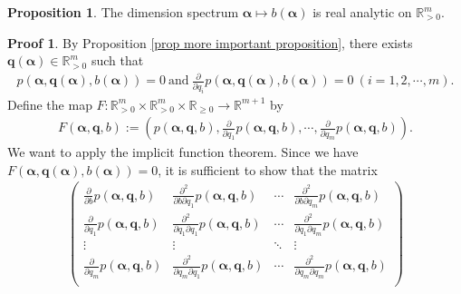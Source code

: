 \documentclass{article}
\theoremstyle{definition}
\newtheorem{prop}[thm]{Proposition}
\newtheorem*{pf}{Proof}
\begin{document}
\begin{prop}\label{prop regularity of the dimension spectrum}
The dimension spectrum $\boldsymbol{\alpha} \mapsto b(\boldsymbol{\alpha})$ is real analytic on $\mathbb{R}_{>0}^m$.
\end{prop}






\begin{pf}
By Proposition \ref{prop more important proposition}, there exists $\boldsymbol{q}(\boldsymbol{\alpha})\in\mathbb{R}_{>0}^m$ such that 
\begin{align}\nonumber
    p(\boldsymbol{\alpha},\boldsymbol{q}(\boldsymbol{\alpha}),b(\boldsymbol{\alpha}))=0\ \text{and}\ \frac{\partial}{\partial q_i}p(\boldsymbol{\alpha},\boldsymbol{q}(\boldsymbol{\alpha}),b(\boldsymbol{\alpha}))=0\ (i=1,2,\cdots,m).\nonumber
\end{align}
Define the map 
$F:\mathbb{R}^m_{>0}\times\mathbb{R}^m_{>0}\times\mathbb{R}_{\geq 0}\rightarrow\mathbb{R}^{m+1}$ by
\begin{align}
F(\boldsymbol{\alpha},\boldsymbol{q},b):=\left(p(\boldsymbol{\alpha},\boldsymbol{q},b), \frac{\partial}{\partial q_1}p(\boldsymbol{\alpha},\boldsymbol{q},b),\cdots, \frac{\partial}{\partial q_m}p(\boldsymbol{\alpha},\boldsymbol{q},b)\right)\nonumber.
\end{align}
We want to apply the implicit function theorem. Since we have $F(\boldsymbol{\alpha},\boldsymbol{q}(\boldsymbol{\alpha}),b(\boldsymbol{\alpha}))=0$, it is sufficient to show that the matrix 
\begin{align}\nonumber
\begin{pmatrix}
\frac{\partial}{\partial b}p(\boldsymbol{\alpha},\boldsymbol{q},b)
&\frac{\partial^2}{\partial b\partial q_1}p(\boldsymbol{\alpha},\boldsymbol{q},b)
&\cdots
&\frac{\partial^2}{\partial b\partial q_m}p(\boldsymbol{\alpha},\boldsymbol{q},b)\\
\frac{\partial}{\partial q_1}p(\boldsymbol{\alpha},\boldsymbol{q},b)
&\frac{\partial^2}{\partial q_1\partial q_1}p(\boldsymbol{\alpha},\boldsymbol{q},b)
&\cdots
&\frac{\partial^2}{\partial q_1\partial q_m}p(\boldsymbol{\alpha},\boldsymbol{q},b)\\
\vdots&\vdots&\ddots&\vdots\\
\frac{\partial}{\partial q_m}p(\boldsymbol{\alpha},\boldsymbol{q},b)
&\frac{\partial^2}{\partial q_m\partial q_1}p(\boldsymbol{\alpha},\boldsymbol{q},b)
&\cdots
&\frac{\partial^2}{\partial q_m\partial q_m}p(\boldsymbol{\alpha},\boldsymbol{q},b)\\

\end{pmatrix}
\end{align}
\end{pf}
\end{document}
